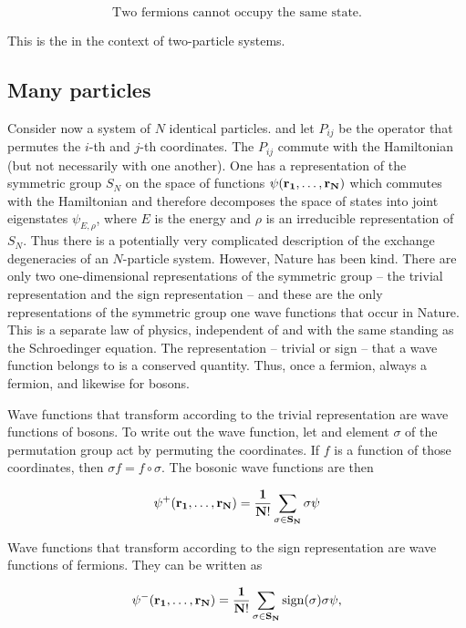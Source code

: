 \begin{equation}
\text{Two fermions cannot occupy the same state.}
\end{equation}

This is the  in the context of two-particle systems.

\subsection{Many particles}

Consider now a system of $N$ identical particles. and let $P_{ij}$ be the operator that permutes the $i$-th and $j$-th coordinates.  The $P_{ij}$ commute with the Hamiltonian (but not necessarily with one another).  One has a representation of the symmetric group $S_N$ on the space of functions $\psi(\bf{r}_1, \ldots, \bf{r}_N)$ which commutes with the Hamiltonian and therefore decomposes the space of states into joint eigenstates $\psi_{E,\rho}$, where $E$ is the energy and $\rho$ is an irreducible representation of $S_N$.  Thus there is a potentially very complicated description of the exchange degeneracies of an $N$-particle system.  However, Nature has been kind.  There are only two one-dimensional representations of the symmetric group -- the trivial representation and the sign representation -- and these are the only representations of the symmetric group one wave functions that occur in Nature.  This is a separate law of physics, independent of and with the same standing as the Schroedinger equation.  The representation -- trivial or sign -- that a wave function belongs to is a conserved quantity.  Thus, once a fermion, always a fermion, and likewise for bosons.

Wave functions that transform according to the trivial representation are wave functions of bosons.  To write out the wave function, let and element $\sigma$ of the permutation group act by permuting the coordinates.  If $f$ is a function of those coordinates, then $\sigma f = f\circ \sigma$.  The bosonic wave functions are then

\begin{equation}
 \psi^+(\bf{r}_1, \ldots , \bf{r}_N)
=
\frac{1}{N!} \sum_{\sigma \in S_N} \sigma \psi
\end{equation}

Wave functions that transform according to the sign representation are wave functions of fermions.  They can be written as

\begin{equation}
 \psi^-(\bf{r}_1, \ldots , \bf{r}_N)
=
\frac{1}{N!} \sum_{\sigma \in S_N} \text{sign}(\sigma)\sigma \psi,
\end{equation}

